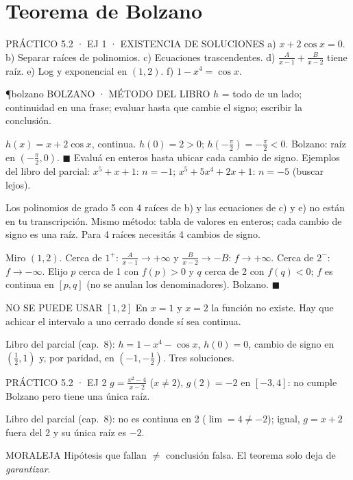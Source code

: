 \section{Teorema de Bolzano}

\begin{enunciado}{PRÁCTICO 5.2 · EJ 1 · EXISTENCIA DE SOLUCIONES}
a) $x+2\cos x=0$. b) Separar raíces de polinomios. c) Ecuaciones trascendentes. d) $\frac A{x-1}+\frac B{x-2}$ tiene raíz. e) Log y exponencial en $(1,2)$. f) $1-x^4=\cos x$.
\end{enunciado}
\begin{uso}{\P{bolzano} BOLZANO · MÉTODO DEL LIBRO}
$h$ = todo de un lado; continuidad en una frase; evaluar hasta que cambie el signo; escribir la conclusión.
\end{uso}
$h(x)=x+2\cos x$, continua. $h(0)=2>0$; $h(-\frac\pi2)=-\frac\pi2<0$. Bolzano: raíz en $(-\frac\pi2,0)$. $\blacksquare$
Evaluá en enteros hasta ubicar cada cambio de signo. Ejemplos del libro del parcial: $x^5+x+1$: $n=-1$; $x^5+5x^4+2x+1$: $n=-5$ (buscar lejos).
\begin{falta}
Los polinomios de grado 5 con 4 raíces de b) y las ecuaciones de c) y e) no están en tu transcripción. Mismo método: tabla de valores en enteros; cada cambio de signo es una raíz. Para 4 raíces necesitás 4 cambios de signo.
\end{falta}
Miro $(1,2)$. Cerca de $1^+$: $\frac A{x-1}\to+\infty$ y $\frac B{x-2}\to-B$: $f\to+\infty$. Cerca de $2^-$: $f\to-\infty$. Elijo $p$ cerca de 1 con $f(p)>0$ y $q$ cerca de 2 con $f(q)<0$; $f$ es continua en $[p,q]$ (no se anulan los denominadores). Bolzano. $\blacksquare$
\begin{trampa}{NO SE PUEDE USAR $[1,2]$}
En $x=1$ y $x=2$ la función no existe. Hay que achicar el intervalo a uno cerrado donde sí sea continua.
\end{trampa}
Libro del parcial (cap.\ 8): $h=1-x^4-\cos x$, $h(0)=0$, cambio de signo en $(\frac12,1)$ y, por paridad, en $(-1,-\frac12)$. Tres soluciones.

\begin{enunciado}{PRÁCTICO 5.2 · EJ 2}
$g=\frac{x^2-4}{x-2}$ ($x\neq2$), $g(2)=-2$ en $[-3,4]$: no cumple Bolzano pero tiene una única raíz.
\end{enunciado}
Libro del parcial (cap.\ 8): no es continua en 2 ($\lim=4\neq-2$); igual, $g=x+2$ fuera del 2 y su única raíz es $-2$.
\begin{tip}{MORALEJA}
Hipótesis que fallan $\neq$ conclusión falsa. El teorema solo deja de \emph{garantizar}.
\end{tip}

